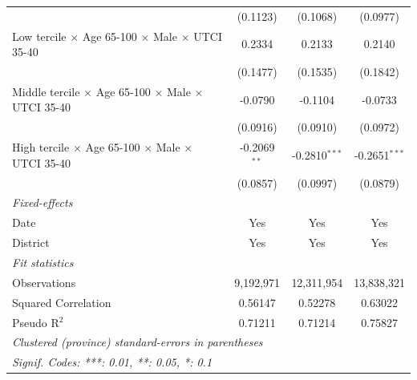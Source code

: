 \begin{table}[htbp]
\begin{tabular}{lccc}
                                                                                & (0.1123)       & (0.1068)          & (0.0977)\\   
      Low tercile $\times$ Age 65-100 $\times$ Male $\times$ UTCI 35-40         & 0.2334         & 0.2133            & 0.2140\\   
                                                                                & (0.1477)       & (0.1535)          & (0.1842)\\   
      Middle tercile $\times$ Age 65-100 $\times$ Male $\times$ UTCI 35-40      & -0.0790        & -0.1104           & -0.0733\\   
                                                                                & (0.0916)       & (0.0910)          & (0.0972)\\   
      High tercile $\times$ Age 65-100 $\times$ Male $\times$ UTCI 35-40        & -0.2069$^{**}$ & -0.2810$^{***}$   & -0.2651$^{***}$\\   
                                                                                & (0.0857)       & (0.0997)          & (0.0879)\\   
      \midrule
      \emph{Fixed-effects}\\
      Date                                                                      & Yes            & Yes               & Yes\\  
      District                                                                  & Yes            & Yes               & Yes\\  
      \midrule
      \emph{Fit statistics}\\
      Observations                                                              & 9,192,971      & 12,311,954        & 13,838,321\\  
      Squared Correlation                                                       & 0.56147        & 0.52278           & 0.63022\\  
      Pseudo R$^2$                                                              & 0.71211        & 0.71214           & 0.75827\\  
      \midrule \midrule
      \multicolumn{4}{l}{\emph{Clustered (province) standard-errors in parentheses}}\\
      \multicolumn{4}{l}{\emph{Signif. Codes: ***: 0.01, **: 0.05, *: 0.1}}\\
   \end{tabular}
\end{table}


